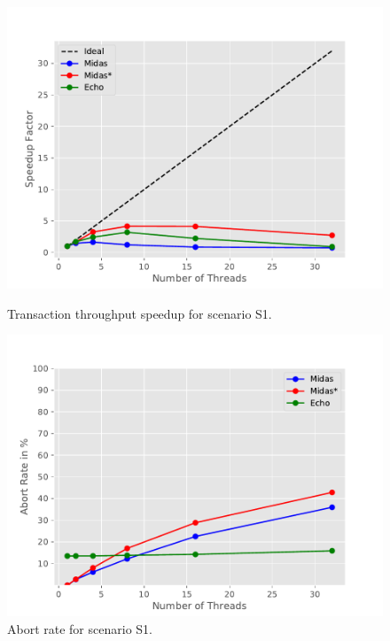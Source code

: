 \begin{figure}[h!]
\begin{minipage}[l]{0.50\textwidth}
    \includegraphics[width=\textwidth]{figures/bench/spd-ss}
    \caption{Transaction throughput speedup for scenario S1.}
    \label{fig:concept-two-level-store}
\end{minipage}
\begin{minipage}[l]{0.50\textwidth}
    \includegraphics[width=\textwidth]{figures/bench/ar-ss}
    \caption{Abort rate for scenario S1.}
    \label{fig:concept-two-level-store}
\end{minipage}
\end{figure}


